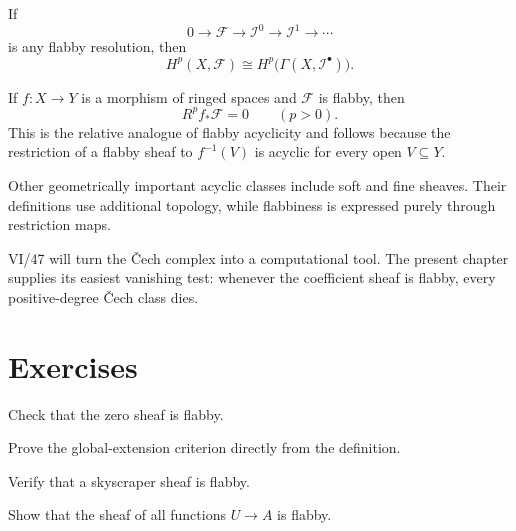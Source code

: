 \begin{corollary}\label{cor:vi46-derived}
If
\[
0\to\mathcal F\to\mathcal I^0\to\mathcal I^1\to\cdots
\]
is any flabby resolution, then
\[
H^p(X,\mathcal F)
\cong
H^p\bigl(\Gamma(X,\mathcal I^\bullet)\bigr).
\]
\end{corollary}

\begin{proposition}\label{prop:vi46-higher-direct-preview}
If $f:X\to Y$ is a morphism of ringed spaces and $\mathcal F$ is flabby, then
\[
R^pf_*\mathcal F=0
\qquad(p>0).
\]
This is the relative analogue of flabby acyclicity and follows because the restriction of a flabby sheaf to $f^{-1}(V)$ is acyclic for every open $V\subseteq Y$.
\end{proposition}

\begin{remark}\label{remark:vi46-soft-fine}
Other geometrically important acyclic classes include soft and fine sheaves. Their definitions use additional topology, while flabbiness is expressed purely through restriction maps.
\end{remark}

\begin{remark}[Bridge to VI/47]\label{remark:vi46-next}
VI/47 will turn the \v{C}ech complex into a computational tool. The present chapter supplies its easiest vanishing test: whenever the coefficient sheaf is flabby, every positive-degree \v{C}ech class dies.
\end{remark}

\section{Exercises}
\begin{exercise}\label{exr:vi46-01}
Check that the zero sheaf is flabby.
\end{exercise}

\begin{exercise}\label{exr:vi46-02}
Prove the global-extension criterion directly from the definition.
\end{exercise}

\begin{exercise}\label{exr:vi46-03}
Verify that a skyscraper sheaf is flabby.
\end{exercise}

\begin{exercise}\label{exr:vi46-04}
Show that the sheaf of all functions $U\to A$ is flabby.
\end{exercise}

